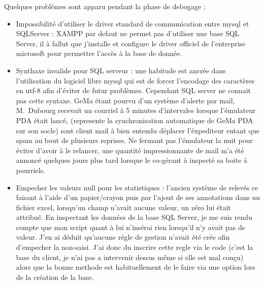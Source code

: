 Quelques problèmes sont apparu pendant la phase de debogage :
\begin{itemize}

  \item Impossibilité d'utiliser le driver standard de communication
    entre mysql et SQLServer : XAMPP par defaut ne permet pas d'utiliser
    une base SQL Server, il à fallut que j'installe et configure le
    driver officiel de l'entreprise microsoft pour permettre l'accès à
    la base de donnée.

  \item Synthaxe invalide pour SQL serveur : une habitude est ancrée
    dans l'utilisation du logiciel libre mysql qui est de forcer
    l'encodage des caractères en utf-8 afin d'éviter de futur problèmes.
    Cependant SQL server ne connait pas cette syntaxe. GeMa étant pourvu
    d'un système d'alerte par mail, M.~Dubourg recevait un courriel à 5
    minutes d'intervales lorsque l'émulateur PDA était lancé,
    (represente la synchronisation automatique de GeMa PDA sur son
    socle) sont client mail à bien entendu déplacer l'éxpediteur entant
    que spam au bout de plusieurs reprises. Ne fermant pas l'émulateur
    la nuit pour éviter d'avoir à le relancer, une quantité
    impressionnante de mail m'a été annoncé quelques jours plus tard
    lorsque le co-gérant à inspecté sa boite à pourriels.

  \item Empecher les valeurs null pour les statistiques : l'ancien
    système de relevés ce faisant à l'aide d'un papier/crayon puis par
    l'ajout de ses annotations dans un fichier excel, lorsqu'un champ
    n'avait aucune valeur, un zéro lui était attribué. En inspectant les
    données de la base SQL Server, je me suis rendu compte que mon
    script quant à lui n'insérai rien lorsqu'il n'y avait pas de valeur.
    J'en ai déduit qu'aucune régle de gestion n'avait été crée afin
    d'empecher la non-saisi. J'ai donc du inscrire cette regle via le
    code (c'est la base du client, je n'ai pas a intervenir dessus même
    si elle est mal conçu) alors que la bonne methode est habituellement
    de le faire via une option lors de la création de la base.
\end{itemize}
